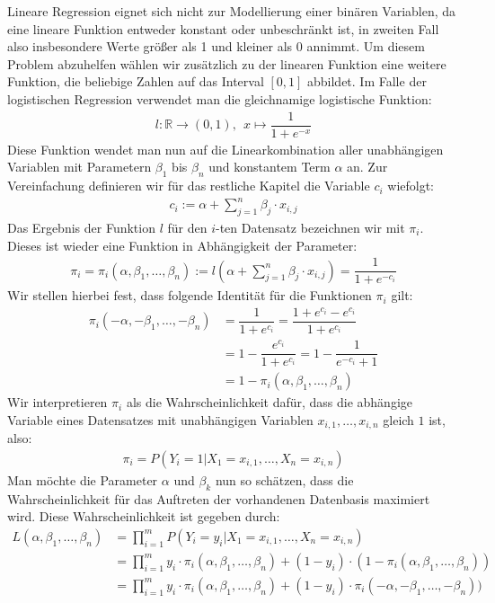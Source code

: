 Lineare Regression eignet sich nicht zur Modellierung einer binären Variablen, da eine lineare Funktion entweder konstant oder unbeschränkt ist, in zweiten Fall also insbesondere Werte größer als 1 und kleiner als 0 annimmt. Um diesem Problem abzuhelfen wählen wir zusätzlich zu der linearen Funktion eine weitere Funktion, die beliebige Zahlen auf das Interval $[0, 1]$ abbildet. Im Falle der logistischen Regression verwendet man die gleichnamige logistische Funktion:
\begin{align*}
    l: \mathbb{R} \rightarrow (0, 1),~~ x \mapsto \dfrac{1}{1+e^{-x}}
\end{align*}
Diese Funktion wendet man nun auf die Linearkombination aller unabhängigen Variablen mit Parametern $\beta_1$ bis $\beta_n$ und konstantem Term $\alpha$ an. Zur Vereinfachung definieren wir für das restliche Kapitel die Variable $c_i$ wiefolgt:
\begin{align*}
    c_i := \alpha + \sum_{j=1}^n \beta_j \cdot x_{i, j}
\end{align*}
Das Ergebnis der Funktion $l$ für den $i$-ten Datensatz bezeichnen wir mit $\pi_i$. Dieses ist wieder eine Funktion in Abhängigkeit der Parameter:
\begin{align*}
    \pi_i = \pi_i(\alpha, \beta_1, \dots, \beta_n) := l \left( \alpha + \sum_{j=1}^n \beta_j \cdot x_{i, j} \right) = \dfrac{1}{1 + e^{-c_i}}
\end{align*}
Wir stellen hierbei fest, dass folgende Identität für die Funktionen $\pi_i$ gilt:
\begin{align*}
    \pi_i(- \alpha, - \beta_1, \dots, - \beta_n) &= \dfrac{1}{1 + e^{c_i}} = \dfrac{1 + e^{c_i} - e^{c_i}}{1 + e^{c_i}} \\
    &= 1 - \dfrac{e^{c_i}}{1 + e^{c_i}} = 1 - \dfrac{1}{e^{-c_i} + 1} \\
    &= 1 - \pi_i(\alpha, \beta_1, \dots, \beta_n)
\end{align*}
Wir interpretieren $\pi_i$ als die Wahrscheinlichkeit dafür, dass die abhängige Variable eines Datensatzes mit unabhängigen Variablen $x_{i, 1}, \dots, x_{i, n}$ gleich $1$ ist, also:
\begin{align*}
    \pi_i = P(Y_i = 1 | X_1 = x_{i, 1}, \dots, X_n = x_{i, n})
\end{align*}
Man möchte die Parameter $\alpha$ und $\beta_k$ nun so schätzen, dass die Wahrscheinlichkeit für das Auftreten der vorhandenen Datenbasis maximiert wird. Diese Wahrscheinlichkeit ist gegeben durch:
\begin{align*}
    L(\alpha, \beta_1, \dots, \beta_n) &= \prod_{i=1}^m P(Y_i = y_i | X_1 = x_{i, 1}, \dots, X_n = x_{i, n}) \\
    &= \prod_{i=1}^m y_i \cdot \pi_i(\alpha, \beta_1, \dots, \beta_n) + (1 - y_i) \cdot (1 - \pi_i(\alpha, \beta_1, \dots, \beta_n)) \\
    &= \prod_{i=1}^m y_i \cdot \pi_i(\alpha, \beta_1, \dots, \beta_n) + (1 - y_i) \cdot \pi_i(- \alpha, - \beta_1, \dots, - \beta_n))
\end{align*}
